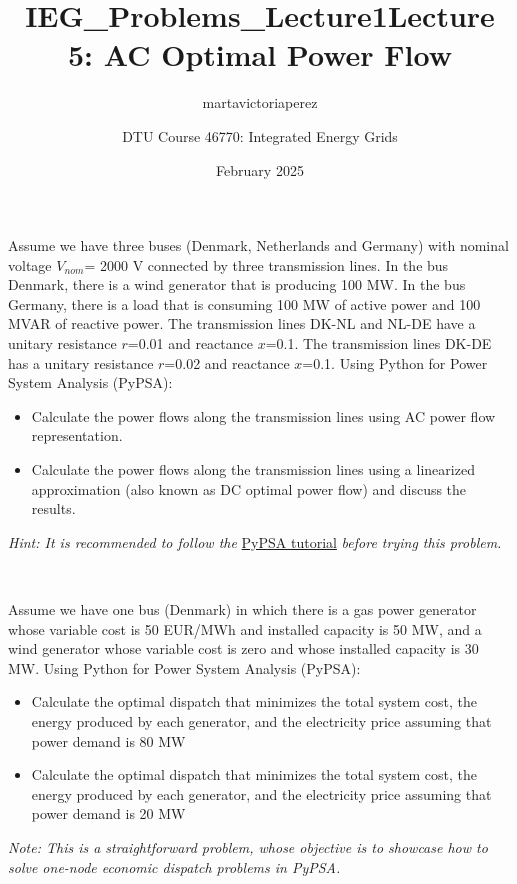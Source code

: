 \documentclass[10pt]{article}
\title{IEG_Problems_Lecture1}
\author{martavictoriaperez }
\date{February 2025}
\newenvironment{problem}[2][Problem]{\begin{trivlist}
\item[\hskip \labelsep {\bfseries #1}\hskip \labelsep {\bfseries #2.}]}{\end{trivlist}}
\begin{document}
 
\title{\textbf{Lecture 5: AC Optimal Power Flow}}
\author{
DTU Course 46770: Integrated Energy Grids }
\maketitle
\begin{problem}{5.1}
Assume we have three buses (Denmark, Netherlands and Germany) with nominal voltage $V_{nom}$= 2000 V connected by three transmission lines. In the bus Denmark, there is a wind generator that is producing 100 MW. In the bus Germany, there is a load that is consuming 100 MW of active power and 100 MVAR of reactive power. The transmission lines DK-NL and NL-DE have a unitary resistance $r$=0.01 and reactance $x$=0.1. The transmission lines DK-DE has a unitary resistance $r$=0.02 and reactance $x$=0.1. Using Python for Power System Analysis (PyPSA):

\begin{itemize}
\item[a)] Calculate the power flows along the transmission lines using AC power flow representation.

\item[b)]  Calculate the power flows along the transmission lines using a linearized approximation (also known as DC optimal power flow) and discuss the results.
\end{itemize}

\textit{Hint: It is recommended to follow the} \href{https://martavp.github.io/integrated-energy-grids/intro-pypsa.html#}{PyPSA tutorial} \textit{before trying this problem.}

\end{problem}

\

\begin{problem}{5.2}

Assume we have one bus (Denmark) in which there is a gas power generator whose variable cost is 50 EUR/MWh and installed capacity is 50 MW, and a wind generator whose variable cost is zero and whose installed capacity is 30 MW. Using Python for Power System Analysis (PyPSA):

\begin{itemize}
\item[a)] Calculate the optimal dispatch that minimizes the total system cost, the energy produced by each generator, and the electricity price assuming that power demand is 80 MW

\item[b)]  Calculate the optimal dispatch that minimizes the total system cost, the energy produced by each generator, and the electricity price assuming that power demand is 20 MW
\end{itemize}

\textit{Note: This is a straightforward problem, whose objective is to showcase how to solve one-node economic dispatch problems in PyPSA.}

\end{problem}
\end{document}
